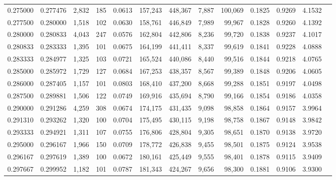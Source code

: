 \begin{tabular}{rrrrrrrrrrrrr}
0.275000 & 0.277476 & 2,832 & 185 &                                     0.0613 & 157,243 & 448,367 &   7,887 & 100,069 & 0.1825 & 0.9269 & 4.1532 \\
0.277500 & 0.280000 & 1,518 & 102 &                                     0.0630 & 158,761 & 446,849 &   7,989 &  99,967 & 0.1828 & 0.9260 & 4.1392 \\
0.280000 & 0.280833 & 4,043 & 247 &                                     0.0576 & 162,804 & 442,806 &   8,236 &  99,720 & 0.1838 & 0.9237 & 4.1017 \\
0.280833 & 0.283333 & 1,395 & 101 &                                     0.0675 & 164,199 & 441,411 &   8,337 &  99,619 & 0.1841 & 0.9228 & 4.0888 \\
0.283333 & 0.284977 & 1,325 & 103 &                                     0.0721 & 165,524 & 440,086 &   8,440 &  99,516 & 0.1844 & 0.9218 & 4.0765 \\
0.285000 & 0.285972 & 1,729 & 127 &                                     0.0684 & 167,253 & 438,357 &   8,567 &  99,389 & 0.1848 & 0.9206 & 4.0605 \\
0.286000 & 0.287405 & 1,157 & 101 &                                     0.0803 & 168,410 & 437,200 &   8,668 &  99,288 & 0.1851 & 0.9197 & 4.0498 \\
0.287500 & 0.289881 & 1,506 & 122 &                                     0.0749 & 169,916 & 435,694 &   8,790 &  99,166 & 0.1854 & 0.9186 & 4.0358 \\
0.290000 & 0.291286 & 4,259 & 308 &                                     0.0674 & 174,175 & 431,435 &   9,098 &  98,858 & 0.1864 & 0.9157 & 3.9964 \\
0.291310 & 0.293262 & 1,320 & 100 &                                     0.0704 & 175,495 & 430,115 &   9,198 &  98,758 & 0.1867 & 0.9148 & 3.9842 \\
0.293333 & 0.294921 & 1,311 & 107 &                                     0.0755 & 176,806 & 428,804 &   9,305 &  98,651 & 0.1870 & 0.9138 & 3.9720 \\
0.295000 & 0.296167 & 1,966 & 150 &                                     0.0709 & 178,772 & 426,838 &   9,455 &  98,501 & 0.1875 & 0.9124 & 3.9538 \\
0.296167 & 0.297619 & 1,389 & 100 &                                     0.0672 & 180,161 & 425,449 &   9,555 &  98,401 & 0.1878 & 0.9115 & 3.9409 \\
0.297667 & 0.299952 & 1,182 & 101 &                                     0.0787 & 181,343 & 424,267 &   9,656 &  98,300 & 0.1881 & 0.9106 & 3.9300 \\

\end{tabular}
